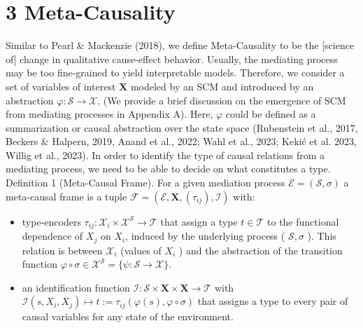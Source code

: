 \documentclass[10pt]{article}
\begin{document}
\section*{3 Meta-Causality}
Similar to Pearl \& Mackenzie (2018), we define Meta-Causality to be the [science of] change in qualitative cause-effect behavior. Usually, the mediating process may be too fine-grained to yield interpretable models. Therefore, we consider a set of variables of interest $\mathbf{X}$ modeled by an SCM and introduced by an abstraction $\varphi: \mathcal{S} \rightarrow \mathcal{X}$. (We provide a brief discussion on the emergence of SCM from mediating processes in Appendix A). Here, $\varphi$ could be defined as a summarization or causal abstraction over the state space (Rubenstein et al., 2017, Beckers \& Halpern, 2019, Anand et al., 2022; Wahl et al., 2023; Kekić et al. 2023, Willig et al., 2023). In order to identify the type of causal relations from a mediating process, we need to be able to decide on what constitutes a type.\\
Definition 1 (Meta-Causal Frame). For a given mediation process $\mathcal{E}=(\mathcal{S}, \sigma)$ a meta-causal frame is a tuple $\mathcal{F}=\left(\mathcal{E}, \mathbf{X},\left(\tau_{i j}\right), \mathcal{I}\right)$ with:

\begin{itemize}
  \item type-encoders $\tau_{i j}: \mathcal{X}_{i} \times \mathcal{X}^{\mathcal{S}} \rightarrow \mathcal{T}$ that assign a type $t \in \mathcal{T}$ to the functional dependence of $X_{j}$ on $X_{i}$, induced by the underlying process ( $\mathcal{S}, \sigma$ ). This relation is between $\mathcal{X}_{i}$ (values of $X_{i}$ ) and the abstraction of the transition function $\varphi \circ \sigma \in \mathcal{X}^{\mathcal{S}}=\{\psi: \mathcal{S} \rightarrow \mathcal{X}\}$.
  \item an identification function $\mathcal{I}: \mathcal{S} \times \mathbf{X} \times \mathbf{X} \rightarrow \mathcal{T}$ with $\mathcal{I}\left(s, X_{i}, X_{j}\right) \mapsto t:=\tau_{i j}(\varphi(s), \varphi \circ \sigma)$ that assigns a type to every pair of causal variables for any state of the environment.
\end{itemize}
\end{document}

